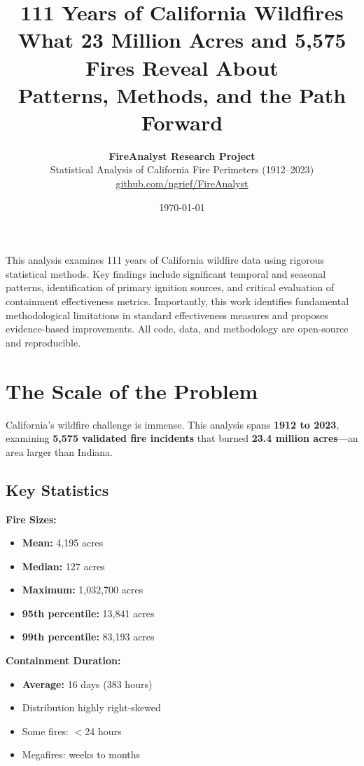 \documentclass[11pt,a4paper]{article}
\title{
    \textbf{\LARGE 111 Years of California Wildfires} \\
    \vspace{0.3cm}
    \large What 23 Million Acres and 5,575 Fires Reveal About \\
    Patterns, Methods, and the Path Forward
}
\author{
    \textbf{FireAnalyst Research Project} \\
    \small Statistical Analysis of California Fire Perimeters (1912--2023) \\
    \vspace{0.2cm}
    \small \href{https://github.com/ngrief/FireAnalyst}{github.com/ngrief/FireAnalyst}
}
\date{\today}
\begin{document}
\maketitle

\begin{tcolorbox}[colback=infocolor!5!white, colframe=infocolor, title=\textbf{Executive Summary}]
This analysis examines 111 years of California wildfire data using rigorous statistical methods. Key findings include significant temporal and seasonal patterns, identification of primary ignition sources, and critical evaluation of containment effectiveness metrics. Importantly, this work identifies fundamental methodological limitations in standard effectiveness measures and proposes evidence-based improvements. All code, data, and methodology are open-source and reproducible.
\end{tcolorbox}

\vspace{0.3cm}

\section{The Scale of the Problem}

California's wildfire challenge is immense. This analysis spans \textbf{1912 to 2023}, examining \textbf{5,575 validated fire incidents} that burned \textbf{23.4 million acres}---an area larger than Indiana.

\subsection{Key Statistics}

\begin{multicols}{2}
\textbf{Fire Sizes:}
\begin{itemize}[leftmargin=*]
    \item \textbf{Mean:} 4,195 acres
    \item \textbf{Median:} 127 acres
    \item \textbf{Maximum:} 1,032,700 acres
    \item \textbf{95th percentile:} 13,841 acres
    \item \textbf{99th percentile:} 83,193 acres
\end{itemize}

\textbf{Containment Duration:}
\begin{itemize}[leftmargin=*]
    \item \textbf{Average:} 16 days (383 hours)
    \item Distribution highly right-skewed
    \item Some fires: $<$24 hours
    \item Megafires: weeks to months
\end{itemize}
\end{multicols}
\end{document}
